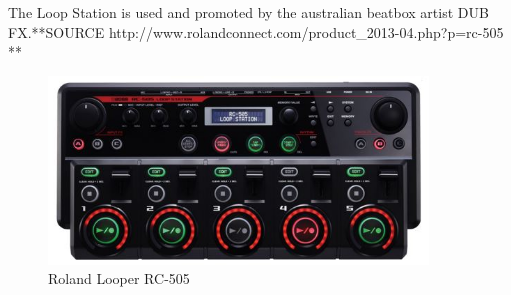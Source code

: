 The Loop Station is used and promoted by the australian beatbox artist DUB FX.**SOURCE http://www.rolandconnect.com/product_2013-04.php?p=rc-505 **


\begin{figure}[h]
	\begin{center}
		\includegraphics[height=5cm]{fig/Roland-RC-505.JPG}
		\caption{Roland Looper RC-505}
		\label{Looper}
	\end{center}
\end{figure}

